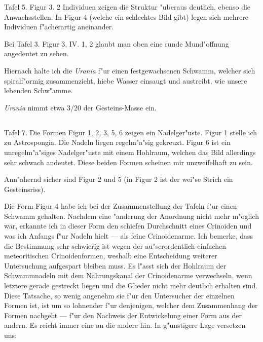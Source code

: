\documentclass[a4paper, 11pt, oneside]{article}
\begin{document}
Tafel 5. Figur 3. 2 Individuen zeigen die Struktur "uberaus deutlich, ebenso die Anwachsstellen. In Figur 4 (welche ein schlechtes Bild gibt) legen sich mehrere Individuen f"acherartig aneinander.

Bei Tafel 3. Figur 3, IV. 1, 2 glaubt man oben eine runde Mund"offnung angedeutet zu sehen.

Hiernach halte ich die \emph{Urania} f"ur einen festgewachsenen Schwamm, welcher sich spiralf"ormig zusammenzieht, hiebe Wasser einsaugt und austreibt, wie unsere lebenden Schw"amme.

\emph{Urania} nimmt etwa 3/20 der Gesteins-Masse ein.
\clearpage
\subsection{}
\paragraph{}
Tafel 7. Die Formen Figur 1, 2, 3, 5, 6 zeigen ein Nadelger"uste. Figur 1 stelle ich zu Astrospongia. Die Nadeln liegen regelm"a"sig gekreuzt. Figur 6 ist ein unregelm"a"siges Nadelger"uste mit einem Hohlraum, welchen das Bild allerdings sehr schwach andeutet. Diese beiden Formen scheinen mir unzweifelhaft zu sein.

Ann"ahernd sicher sind Figur 2 und 5 (in Figur 2 ist der wei"se Strich ein Gesteinsriss).

Die Form Figur 4 habe ich bei der Zusammenstellung der Tafeln f"ur einen Schwamm gehalten. Nachdem eine "anderung der Anordnung nicht mehr m"oglich war, erkannte ich in dieser Form den schiefen Durchschnitt eines Crinoiden und was ich Anfangs f"ur Nadeln hielt --- als feine Crinoidenarme. Ich bemerke, dass die Bestimmung sehr schwierig ist wegen der au"serordentlich einfachen meteoritischen Crinoidenformen, weshalb eine Entscheidung weiterer Untersuchung aufgespart bleiben muss. Es l"asst sich der Hohlraum der Schwammnadeln mit dem Nahrungskanal der Crinoidenarme verwechseln, wenn letztere gerade gestreckt liegen und die Glieder nicht mehr deutlich erhalten sind. Diese Tatsache, so wenig angenehm sie f"ur den Untersucher der einzelnen Formen ist, ist um so lohnender f"ur denjenigen, welcher dem Zusammenhang der Formen nachgeht --- f"ur den Nachweis der Entwickelung einer Form aus der andern. Es reicht immer eine an die andere hin. In g"unstigere Lage versetzen uns:
\clearpage
\subsection{}
\end{document}
